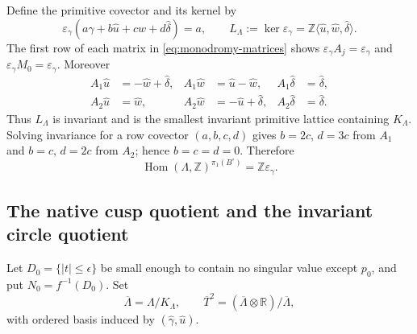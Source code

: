 \documentclass[11pt,letterpaper]{article}
\numberwithin{equation}{section}
\theoremstyle{definition}
\theoremstyle{remark}
\newcommand{\R}{\mathbb R}
\newcommand{\Z}{\mathbb Z}
\begin{document}
Define the primitive covector and its kernel by
\begin{equation}
 \varepsilon_\gamma
 (a\widehat\gamma+b\widehat u+c\widehat w+d\widehat\delta)=a,
 \qquad
 L_\Lambda:=\ker\varepsilon_\gamma
 =\Z\langle\widehat u,\widehat w,\widehat\delta\rangle.
 \label{eq:invariant-character}
\end{equation}
The first row of each matrix in \cref{eq:monodromy-matrices} shows
$\varepsilon_\gamma A_j=\varepsilon_\gamma$ and
$\varepsilon_\gamma M_0=\varepsilon_\gamma$.  Moreover
\begin{equation}
 \begin{aligned}
 A_1\widehat u&=-\widehat w+\widehat\delta,&
 A_1\widehat w&=\widehat u-\widehat w,&
 A_1\widehat\delta&=\widehat\delta,\\
 A_2\widehat u&=\widehat w,&
 A_2\widehat w&=-\widehat u+\widehat\delta,&
 A_2\widehat\delta&=\widehat\delta.
 \end{aligned}
 \label{eq:invariant-flag}
\end{equation}
Thus $L_\Lambda$ is invariant and is the smallest invariant primitive
lattice containing $K_\Lambda$.  Solving invariance for a row covector
$(a,b,c,d)$ gives $b=2c$, $d=3c$ from $A_1$ and $b=c$, $d=2c$ from
$A_2$; hence $b=c=d=0$.  Therefore
\begin{equation}
 \operatorname{Hom}(\Lambda,\Z)^{\pi_1(B^\circ)}
 =\Z\varepsilon_\gamma.
 \label{eq:unique-invariant-character}
\end{equation}

\subsection{The native cusp quotient and the invariant circle quotient}

Let $D_0=\{|t|\le\epsilon\}$ be small enough to contain no singular
value except $p_0$, and put $N_0=f^{-1}(D_0)$.  Set
\begin{equation}
 \overline\Lambda=\Lambda/K_\Lambda,\qquad
 \overline T^2=(\overline\Lambda\otimes\R)/\overline\Lambda,
 \label{eq:bar-torus}
\end{equation}
with ordered basis induced by $(\widehat\gamma,\widehat u)$.
\end{document}
